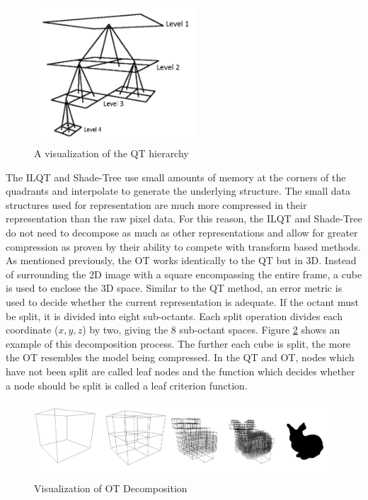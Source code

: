 \begin{figure}[!htb]
\centering
\includegraphics[width=6cm]{images/ch2/QuadTreeHierarchy}
\caption{A visualization of the QT hierarchy}
\label{QuadTreeHierarchy}
\end{figure}

The ILQT and Shade-Tree use small amounts of memory at the corners of the quadrants and interpolate to generate the underlying structure. The small data structures used for representation are much more compressed in their representation than the raw pixel data. For this reason, the ILQT and Shade-Tree do not need to decompose as much as other representations and allow for greater compression as proven by their ability to compete with transform based methods. \\

As mentioned previously, the OT works identically to the QT but in 3D. Instead of surrounding the 2D image with a square encompassing the entire frame, a cube is used to enclose the 3D space. Similar to the QT method, an error metric is used to decide whether the current representation is adequate. If the octant must be split, it is divided into eight sub-octants. Each split operation divides each coordinate ($x,y,z$) by two, giving the 8 sub-octant spaces. Figure \ref{OctreeExample} shows an example of this decomposition process. The further each cube is split, the more the OT resembles the model being compressed. In the QT and OT, nodes which have not been split are called leaf nodes and the function which decides whether a node should be split is called a leaf criterion function. \\ 

\begin{figure}[!htb]
\centering
\includegraphics[width=16cm]{images/ch2/OctreeExample}
\caption{Visualization of OT Decomposition}
\label{OctreeExample}
\end{figure}

